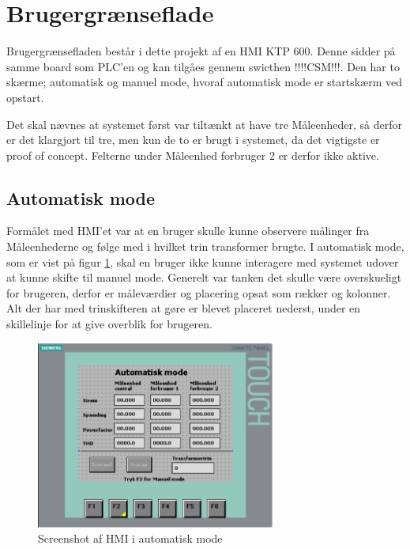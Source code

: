 
\section{Brugergrænseflade}
\label{HMI}

Brugergrænsefladen består i dette projekt af en HMI KTP 600. Denne sidder på samme board som PLC'en og kan tilgåes gennem swicthen !!!!CSM!!!. Den har to skærme; automatisk og manuel mode, hvoraf automatisk mode er startskærm ved opstart.


Det skal nævnes at systemet først var tiltænkt at have tre Måleenheder, så derfor er det klargjort til tre, men kun de to er brugt i systemet, da det vigtigste er proof of concept. Felterne under Måleenhed forbruger 2 er derfor ikke aktive.

\subsection{Automatisk mode}

Formålet med HMI'et var at en bruger skulle kunne observere målinger fra Måleenhederne og følge med i hvilket trin transformer brugte. I automatisk mode, som er vist på figur \ref{fig:HMIAutomatiskModeDesign}, skal en bruger ikke kunne interagere med systemet udover at kunne skifte til manuel mode.
Generelt var tanken det skulle være overskueligt for brugeren, derfor er måleværdier og placering opsat som rækker og kolonner. Alt der har med trinskifteren at gøre er blevet placeret nederst, under en skillelinje for at give overblik for brugeren.

\begin{figure}[H] %
	\centering
	\includegraphics[width=0.7\textwidth]{Figure/HMIAutomatiskModeDesign}
	\caption{Screenshot af HMI i automatisk mode}
	\label{fig:HMIAutomatiskModeDesign}
\end{figure}


